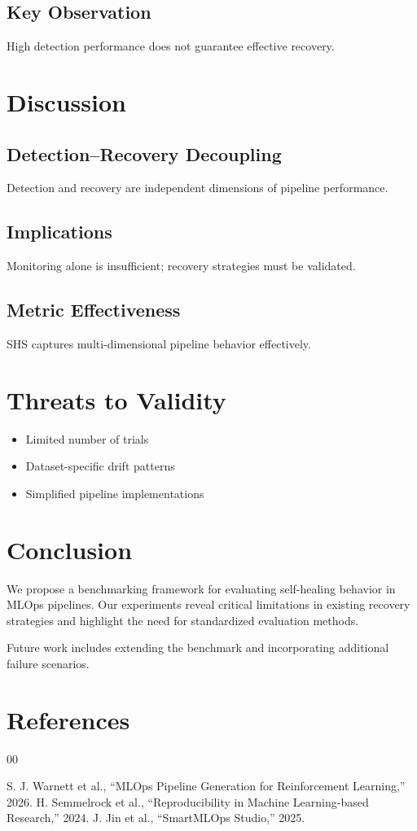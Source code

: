 \documentclass[conference]{IEEEtran}
\begin{document}
\subsection{Key Observation}
High detection performance does not guarantee effective recovery.

\section{Discussion}

\subsection{Detection–Recovery Decoupling}
Detection and recovery are independent dimensions of pipeline performance.

\subsection{Implications}
Monitoring alone is insufficient; recovery strategies must be validated.

\subsection{Metric Effectiveness}
SHS captures multi-dimensional pipeline behavior effectively.

\section{Threats to Validity}

\begin{itemize}
    \item Limited number of trials
    \item Dataset-specific drift patterns
    \item Simplified pipeline implementations
\end{itemize}

\section{Conclusion}

We propose a benchmarking framework for evaluating self-healing behavior in MLOps pipelines. Our experiments reveal critical limitations in existing recovery strategies and highlight the need for standardized evaluation methods.

Future work includes extending the benchmark and incorporating additional failure scenarios.

\section*{References}

\begin{thebibliography}{00}

 S. J. Warnett et al., ``MLOps Pipeline Generation for Reinforcement Learning,'' 2026.
 H. Semmelrock et al., ``Reproducibility in Machine Learning-based Research,'' 2024.
 J. Jin et al., ``SmartMLOps Studio,'' 2025.

\end{thebibliography}
\end{document}

